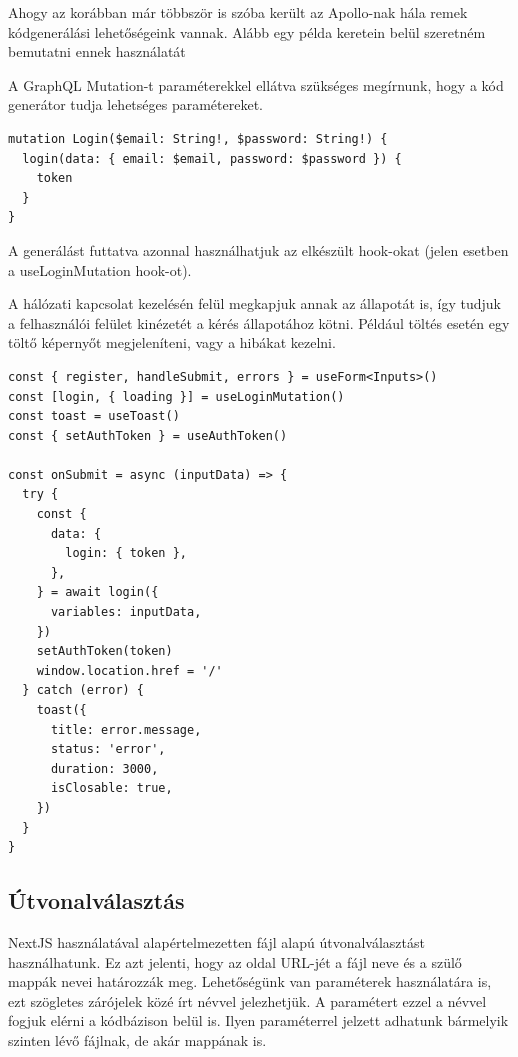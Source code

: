 Ahogy az korábban már többször is szóba került az Apollo-nak hála remek kódgenerálási lehetőségeink vannak.
Alább egy példa keretein belül szeretném bemutatni ennek használatát

A GraphQL Mutation-t paraméterekkel ellátva szükséges megírnunk, hogy a kód generátor tudja lehetséges paramétereket. 
\begin{lstlisting}[style=ES6, caption={GraphQL Shield}]
mutation Login($email: String!, $password: String!) {
  login(data: { email: $email, password: $password }) {
    token
  }
}
\end{lstlisting}

A generálást futtatva azonnal használhatjuk az elkészült hook-okat (jelen esetben a useLoginMutation hook-ot).

A hálózati kapcsolat kezelésén felül megkapjuk annak az állapotát is, így tudjuk a felhasználói felület kinézetét a kérés állapotához kötni.
Például töltés esetén egy töltő képernyőt megjeleníteni, vagy a hibákat kezelni.

\begin{lstlisting}[style=ES6, caption={Bejelentkezés kódrészlet}]
const { register, handleSubmit, errors } = useForm<Inputs>()
const [login, { loading }] = useLoginMutation()
const toast = useToast()
const { setAuthToken } = useAuthToken()

const onSubmit = async (inputData) => {
  try {
    const {
      data: {
        login: { token },
      },
    } = await login({
      variables: inputData,
    })
    setAuthToken(token)
    window.location.href = '/'
  } catch (error) {
    toast({
      title: error.message,
      status: 'error',
      duration: 3000,
      isClosable: true,
    })
  }
}
\end{lstlisting}

\subsection{Útvonalválasztás}
NextJS használatával alapértelmezetten fájl alapú útvonalválasztást használhatunk.
Ez azt jelenti, hogy az oldal URL-jét a fájl neve és a szülő mappák nevei határozzák meg.
Lehetőségünk van paraméterek használatára is, ezt szögletes zárójelek közé írt névvel jelezhetjük.
A paramétert ezzel a névvel fogjuk elérni a kódbázison belül is.
Ilyen paraméterrel jelzett adhatunk bármelyik szinten lévő fájlnak, de akár mappának is.


